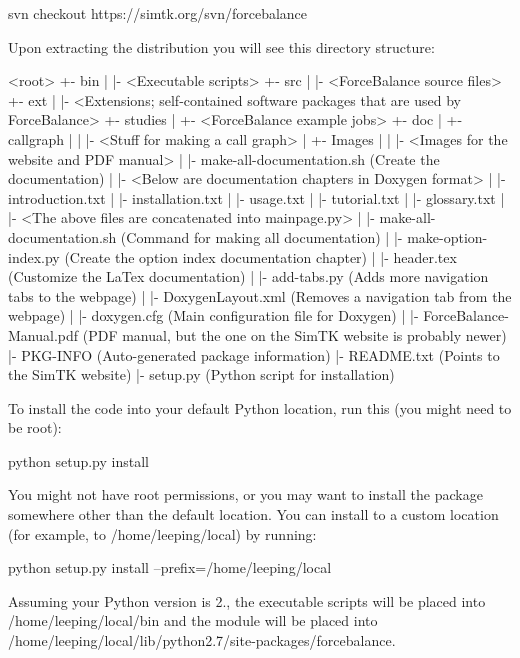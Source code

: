 \begin{DoxyVerb}svn checkout https://simtk.org/svn/forcebalance \end{DoxyVerb}


Upon extracting the distribution you will see this directory structure\+:

\begin{DoxyVerb} <root>
   +- bin
   |   |- <Executable scripts>
   +- src
   |   |- <ForceBalance source files>
   +- ext
   |   |- <Extensions; self-contained software packages that are used by ForceBalance>
   +- studies
   |   +- <ForceBalance example jobs>
   +- doc
   |   +- callgraph
   |   |   |- <Stuff for making a call graph>
   |   +- Images
   |   |   |- <Images for the website and PDF manual>
   |   |- make-all-documentation.sh (Create the documentation)
   |   |- <Below are documentation chapters in Doxygen format>
   |   |- introduction.txt
   |   |- installation.txt
   |   |- usage.txt
   |   |- tutorial.txt
   |   |- glossary.txt
   |   |- <The above files are concatenated into mainpage.py>
   |   |- make-all-documentation.sh (Command for making all documentation)
   |   |- make-option-index.py (Create the option index documentation chapter)
   |   |- header.tex (Customize the LaTex documentation)
   |   |- add-tabs.py (Adds more navigation tabs to the webpage)
   |   |- DoxygenLayout.xml (Removes a navigation tab from the webpage)
   |   |- doxygen.cfg (Main configuration file for Doxygen)
   |   |- ForceBalance-Manual.pdf (PDF manual, but the one on the SimTK website is probably newer)
   |- PKG-INFO (Auto-generated package information)
   |- README.txt (Points to the SimTK website)
   |- setup.py (Python script for installation) \end{DoxyVerb}


To install the code into your default Python location, run this (you might need to be root)\+:

\begin{DoxyVerb}python setup.py install \end{DoxyVerb}


You might not have root permissions, or you may want to install the package somewhere other than the default location. You can install to a custom location (for example, to /home/leeping/local) by running\+:

\begin{DoxyVerb}python setup.py install --prefix=/home/leeping/local \end{DoxyVerb}


Assuming your Python version is 2., the executable scripts will be placed into {\ttfamily /home/leeping/local/bin} and the module will be placed into {\ttfamily /home/leeping/local/lib/python2.7/site-\/packages/forcebalance}.


